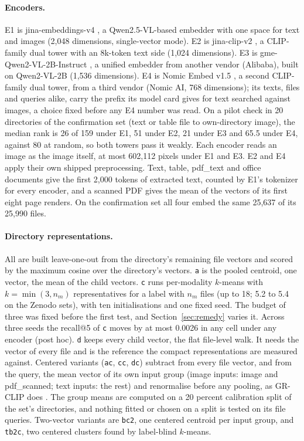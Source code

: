\documentclass[sigconf,natbib=true,anonymous=true]{acmart}
\newcommand{\rep}[1]{\texttt{#1}}
\begin{document}
\paragraph{Encoders.} E1 is jina-embeddings-v4 \citep{gunther2025jinav4}, a Qwen2.5-VL-based embedder with one space for text and images (2,048 dimensions, single-vector mode). E2 is jina-clip-v2 \citep{koukounas2024jinaclipv2}, a CLIP-family dual tower with an 8k-token text side (1,024 dimensions). E3 is gme-Qwen2-VL-2B-Instruct \citep{zhang2025gme}, a unified embedder from another vendor (Alibaba), built on Qwen2-VL-2B (1,536 dimensions). E4 is Nomic Embed v1.5 \citep{nussbaum2024nomicvision,nussbaum2024nomicembed}, a second CLIP-family dual tower, from a third vendor (Nomic AI, 768 dimensions); its texts, files and queries alike, carry the prefix its model card gives for text searched against images, a choice fixed before any E4 number was read. On a pilot check in 20 directories of the confirmation set (text or table file to own-directory image), the median rank is 26 of 159 under E1, 51 under E2, 21 under E3 and 65.5 under E4, against 80 at random, so both towers pass it weakly. Each encoder reads an image as the image itself, at most 602,112 pixels under E1 and E3. E2 and E4 apply their own shipped preprocessing. Text, table, pdf\_text and office documents give the first 2,000 tokens of extracted text, counted by E1's tokenizer for every encoder, and a scanned PDF gives the mean of the vectors of its first eight page renders. On the confirmation set all four embed the same 25,637 of its 25,990 files.

\paragraph{Directory representations.} All are built leave-one-out from the directory's remaining file vectors and scored by the maximum cosine over the directory's vectors. \rep{a} is the pooled centroid, one vector, the mean of the child vectors. \rep{c} runs per-modality $k$-means with $k = \min(3, n_m)$ representatives for a label with $n_m$ files (up to 18; 5.2 to 5.4 on the Zenodo sets), with ten initialisations and one fixed seed. The budget of three was fixed before the first test, and Section~\ref{sec:remedy} varies it. Across three seeds the recall@5 of \rep{c} moves by at most 0.0026 in any cell under any encoder (post hoc). \rep{d} keeps every child vector, the flat file-level walk. It needs the vector of every file and is the reference the compact representations are measured against. Centered variants (\rep{ac}, \rep{cc}, \rep{dc}) subtract from every file vector, and from the query, the mean vector of its own input group (image inputs: image and pdf\_scanned; text inputs: the rest) and renormalise before any pooling, as GR-CLIP does \citep{li2025grclip}. The group means are computed on a 20 percent calibration split of the set's directories, and nothing fitted or chosen on a split is tested on its file queries. Two-vector variants are \rep{bc2}, one centered centroid per input group, and \rep{tb2c}, two centered clusters found by label-blind $k$-means.
\end{document}

